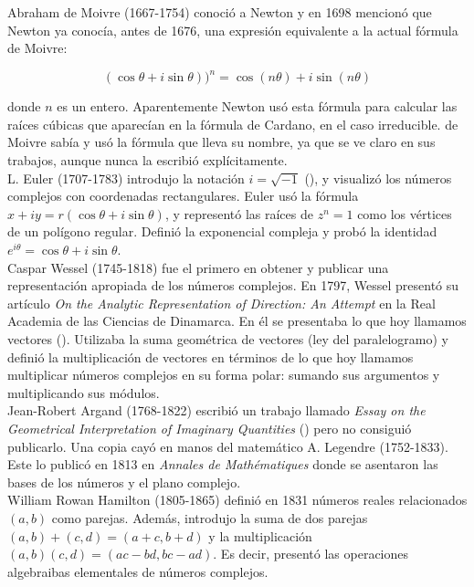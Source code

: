 \documentclass[../main.tex]{memoir}
\begin{document}
Abraham de Moivre (1667-1754) conoció a Newton y en 1698 mencionó que Newton ya conocía, antes de 1676, una expresión equivalente a la actual fórmula de Moivre:

$$(\cos \theta + i \sin \theta))^n = \cos(n\theta) + i \sin(n \theta)$$

donde $n$ es un entero. Aparentemente Newton usó esta fórmula para calcular las raíces cúbicas que aparecían en la fórmula de Cardano, en el caso irreducible. de Moivre sabía y usó la fórmula que lleva su nombre, ya que se ve claro en sus trabajos, aunque nunca la escribió explícitamente. \\

L. Euler (1707-1783) introdujo la notación $i = \sqrt{-1}$ (\cite{dunham1999}), y visualizó los números complejos con coordenadas rectangulares. Euler usó la fórmula $x+iy = r(\cos \theta +i \sin \theta)$, y representó las raíces de $z^n = 1$ como los vértices de un polígono regular. Definió la exponencial compleja y probó la identidad $e^{i\theta} = \cos \theta +i \sin \theta$. \\

Caspar Wessel (1745-1818) fue el primero en obtener y publicar una representación apropiada de los números complejos. En 1797, Wessel presentó su artículo \textit{On the Analytic Representation of Direction: An Attempt} en la Real Academia de las Ciencias de Dinamarca. En él se presentaba lo que hoy llamamos vectores (\cite{crowe1967}). Utilizaba la suma geométrica de vectores (ley del paralelogramo) y definió la multiplicación de vectores en términos de lo que hoy llamamos multiplicar números complejos en su forma polar: sumando sus argumentos y multiplicando sus módulos. \\

Jean-Robert Argand (1768-1822) escribió un trabajo llamado \textit{Essay on the Geometrical Interpretation of Imaginary Quantities} (\cite{argand1971}) pero no consiguió publicarlo. Una copia cayó en manos del matemático A. Legendre (1752-1833). Este lo publicó en 1813 en \textit{Annales de Mathématiques} donde se asentaron las bases de los números y el plano complejo. \\

William Rowan Hamilton (1805-1865) definió en 1831 números reales relacionados $(a,b)$ como parejas. Además, introdujo la suma de dos parejas $(a,b) + (c,d) = (a+c,b+d)$ y la multiplicación $(a,b)(c,d) = (ac-bd,bc-ad)$. Es decir, presentó las operaciones algebraibas elementales de números complejos. \\
\end{document}
